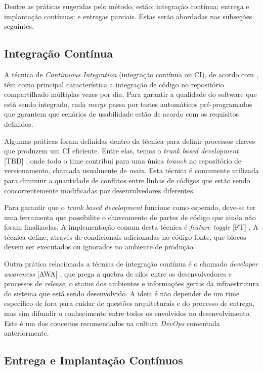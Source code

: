 Dentre as práticas sugeridas pelo método, estão: integração contínua; entrega e implantação contínuas; e entregas parciais. Estas serão abordadas nas subseções seguintes.

\subsection{Integração Contínua}

A técnica de \emph{Continuous Integration} (integração contínua ou CI), de acordo com \cite{fowlerCI}, têm como principal característica a integração de código no repositório compartilhado múltiplas vezes por dia. Para garantir a qualidade do software que está sendo integrado, cada \emph{merge} passa por testes automáticos pré-programados que garantem que cenários de usabilidade estão de acordo com os requisitos definidos. 

Algumas práticas foram definidas dentro da técnica para definir processos chaves que produzem um CI eficiente. Entre elas, temos o \emph{trunk based development} [TBD] \cite{devAndDeploymentFB}, onde todo o time contribui para uma única \emph{branch} no repositório de versionamento, chamada usualmente de \emph{main}. Esta técnica é comumente utilizada para diminuir a quantidade de conflitos entre linhas de códigos que estão sendo concorrentemente modificadas por desenvolvedores diferentes. 

Para garantir que o \emph{trunk based development} funcione como esperado, deve-se ter uma ferramenta que possibilite o chaveamento de partes de código que ainda não foram finalizadas. A implementação comum desta técnica é \emph{feature toggle} [FT] \cite{featureToggles}. A técnica define, através de condicionais adicionadas no código fonte, que blocos devem ser executados ou ignorados no ambiente de produção.

Outra prática relacionada a técnica de integração contínua é o chamado \emph{developer awareness} [AWA] \cite{awa}, que prega a quebra de silos entre os desenvolvedores e processos de \emph{release}, o status dos ambientes e informações gerais da infraestrutura do sistema que está sendo desenvolvido. A ideia é não depender de um time específico de fora para cuidar de questões arquiteturais e do processo de entrega, mas sim difundir o conhecimento entre todos os envolvidos no desenvolvimento. Este é um dos conceitos recomendados na cultura \emph{DevOps} comentada anteriormente.

\subsection{Entrega e Implantação Contínuos}

